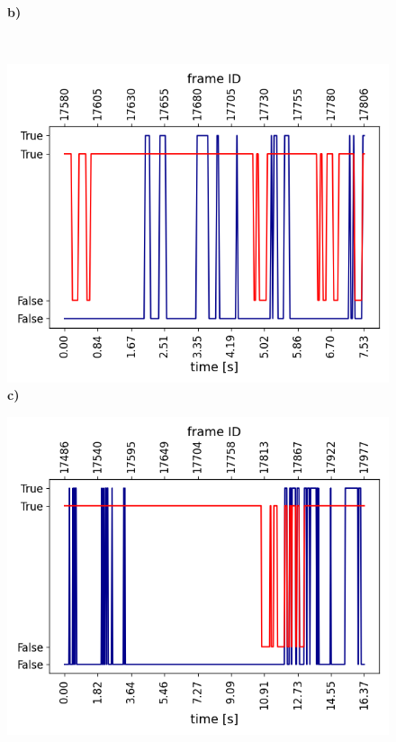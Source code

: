 \begin{figure}
\begin{minipage}{0.5\textwidth}
        \textbf{b)}
    \end{minipage}\hfill \\\vspace{0.2cm}
    \begin{minipage}{0.5\textwidth}
        \centering
        \includegraphics[width=\textwidth]{images/dreyeve/gazes/3.png}
        \textbf{c)}
    \end{minipage}\hfill
    \begin{minipage}{0.5\textwidth}
        \centering
        \includegraphics[width=\textwidth]{images/dreyeve/gazes/4.png}

\end{minipage}
\end{figure}
